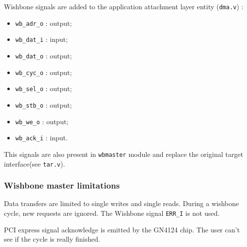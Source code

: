 \documentclass[10pt,a4paper]{cerndoc}
\begin{document}
Wishbone signals are added to the application attachment layer entity (\verb+dma.v+) :
\begin{itemize}
  \item\texttt{wb\_adr\_o} : output;
  \item\texttt{wb\_dat\_i} : input;
  \item\texttt{wb\_dat\_o} : output;
  \item\texttt{wb\_cyc\_o} : output;
  \item\texttt{wb\_sel\_o} : output;
  \item\texttt{wb\_stb\_o} : output;
  \item\texttt{wb\_we\_o} : output;
  \item\texttt{wb\_ack\_i} : input.
\end{itemize}     
   This signals are also present in \verb+wbmaster+ module and replace the original target interface(see \verb+tar.v+).

\subsubsection{Wishbone master limitations}
    Data transfers are limited to single writes and single reads.
    During a wishbone cycle, new requests are ignored. The Wishbone signal \verb+ERR_I+ is not used.
    
PCI express signal acknowledge is emitted by the GN4124 chip. The user can't see if the cycle is really finished.
    
\end{document}
